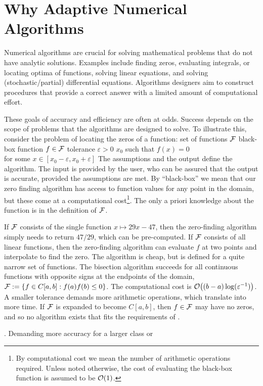 \chapter{Why Adaptive Numerical Algorithms}
Numerical algorithms are crucial for solving mathematical problems that do not have analytic solutions.  Examples include finding zeros, evaluating integrals, or locating optima of functions, solving linear equations, and solving (stochastic/partial) differential equations.  Algorithms designers aim to construct procedures that provide a correct answer with a limited amount of computational effort.  

These goals of accuracy and efficiency are often at odds.  Success depends on the scope of problems that the algorithms are designed to solve.  To illustrate this, consider the problem of locating the zeros of a function:
%
{set of functions $\mathcal{F}$}%
{black-box function $f \in \mathcal{F}$ \newline tolerance $\varepsilon > 0$ }%
{$x_0$ such that $f(x) = 0$ \\ 
    \qquad for some $x \in [x_0 - \varepsilon, x_0 + \varepsilon]$}
The assumptions and the output define the algorithm.  The input is provided by the user, who can be assured that the output is accurate, provided the assumptions are met.  By ``black-box'' we mean that our zero finding algorithm has access to function values for any point in the domain, but these come at a computational cost\footnote{By computational cost we mean the number of arithmetic operations required.  Unless noted otherwise, the cost of evaluating the black-box function is assumed to be $\operatorname{{\mathcal O}}(1)$.}. The only a priori knowledge about the function is in the definition of $\mathcal{F}$.

If $\mathcal{F}$ consists of the single function $x \mapsto 29x - 47$, then the zero-finding algorithm simply needs to return $47/29$, which can be pre-computed.  If $\mathcal{F}$ consists of all linear functions, then the zero-finding algorithm can evaluate $f$ at two points and interpolate to find the zero.  The algorithm is cheap, but is defined for a quite narrow set of functions.  The bisection algorithm succeeds for all continuous functions  with opposite signs at the endpoints of the domain, $\mathcal{F}: = \{ f \in C[a,b] : f(a)f(b) \le 0\}$.  The computational cost is $\operatorname{{\mathcal O}}\bigl((b-a) \log(\varepsilon^{-1}) \bigr)$. A smaller tolerance demands more arithmetic operations, which translate into more time.  If $\mathcal{F}$ is expanded to become $C[a,b]$, then $f \in \mathcal{F}$ may have no zeros, and so no algorithm exists that fits the requirements of .


.  Demanding more accuracy for a larger class or 
